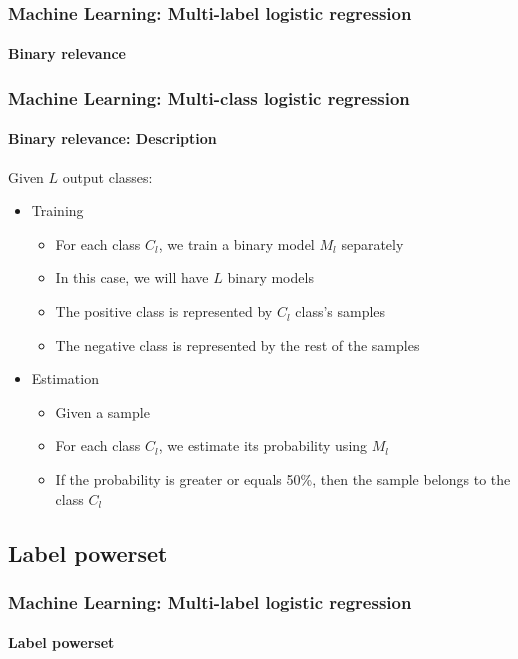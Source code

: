 \documentclass[xcolor=table]{beamer}
\begin{document}
\begin{frame}
	\frametitle{Machine Learning: Multi-label logistic regression}
	\framesubtitle{Binary relevance}
	
	\begin{center}
	\end{center}
	
\end{frame}

\begin{frame}
	\frametitle{Machine Learning: Multi-class logistic regression}
	\framesubtitle{Binary relevance: Description}
	
	Given $L$ output classes:
	\begin{itemize}
		\item Training
		\begin{itemize}
			\item For each class $C_l$, we train a binary model $M_l$ separately
			\item In this case, we will have $L$ binary models
			\item The positive class is represented by $C_l$ class's samples
			\item The negative class is represented by the rest of the samples
		\end{itemize}
		\item Estimation
		\begin{itemize}
			\item Given a sample
			\item For each class $C_l$, we estimate its probability using $M_l$
			\item If the probability is greater or equals 50\%, then the sample belongs to the class $C_l$
		\end{itemize}
	\end{itemize}
	
\end{frame}

\subsection{Label powerset}

\begin{frame}
	\frametitle{Machine Learning: Multi-label logistic regression}
	\framesubtitle{Label powerset}
	
	
\end{frame}
\end{document}
